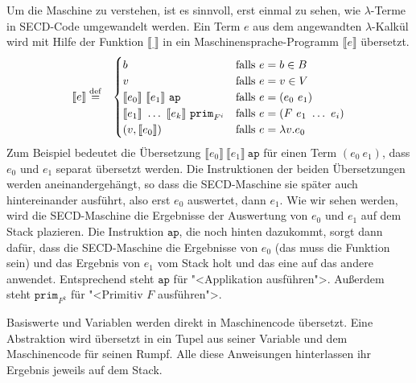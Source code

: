Um die Maschine zu verstehen, ist es sinnvoll, erst einmal zu
sehen, wie $\lambda$-Terme in SECD-Code umgewandelt werden.  
Ein Term $e$ aus dem angewandten $\lambda$-Kalkül wird mit Hilfe der
Funktion $\llbracket \underline{~}\rrbracket$ in ein Maschinensprache-Programm
$\llbracket e\rrbracket$ übersetzt.\label{page:secd-translation}
%
\begin{eqnarray*}
  \llbracket e \rrbracket &\stackrel{\rm def}{=}&
  \begin{cases}
    b & \textrm{falls $e = b \in B$}\\
    v & \textrm{falls $e = v \in V$}\\
    \llbracket e_0\rrbracket~\llbracket e_1\rrbracket~\mathtt{ap}
    & \textrm{falls $e = (e_0~e_1)$}\\
    \llbracket e_1\rrbracket~\ldots~\llbracket e_k\rrbracket~\mathtt{prim}_{F^i}
    & \textrm{falls $e = (F~e_1~\ldots~e_i)$}\\
    (v, \llbracket e_0\rrbracket) & \textrm{falls $e = \lambda v.e_0$}
  \end{cases}
\end{eqnarray*}
%
Zum Beispiel bedeutet die Übersetzung
$\llbracket e_0\rrbracket~\llbracket e_1\rrbracket~\mathtt{ap}$ für
einen Term $(e_0~e_1)$, dass $e_0$ und $e_1$ separat übersetzt werden.
Die Instruktionen der beiden Übersetzungen werden aneinandergehängt,
so dass die SECD-Maschine sie später auch hintereinander ausführt,
also erst $e_0$ auswertet, dann $e_1$.  Wie wir sehen werden, wird die
SECD-Maschine die Ergebnisse der Auswertung von $e_0$ und $e_1$ auf
dem Stack plazieren.  Die Instruktion $\mathtt{ap}$, die noch hinten
dazukommt, sorgt dann dafür, dass die SECD-Maschine die Ergebnisse von
$e_0$ (das muss die Funktion sein) und das Ergebnis von $e_1$ vom
Stack holt und das eine auf das andere anwendet.  Entsprechend steht
$\mathtt{ap}$ für "<Applikation ausführen">.  Außerdem steht
$\mathtt{prim}_{F^k}$ für "<Primitiv $F$ ausführen">.

Basiswerte und Variablen werden direkt in Maschinencode übersetzt.
Eine Abstraktion wird übersetzt in ein Tupel aus seiner Variable und
dem Maschinencode für seinen Rumpf.  Alle diese Anweisungen
hinterlassen ihr Ergebnis jeweils auf dem Stack.

